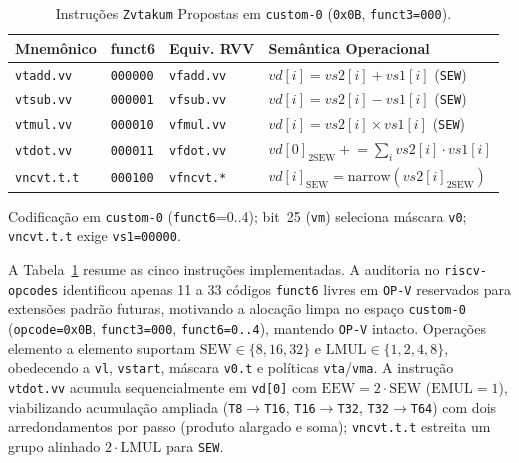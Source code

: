 \documentclass[conference]{IEEEtran}
\begin{document}
\begin{table}[t]
\caption{Instru\c{c}\~oes \texttt{Zvtakum} Propostas em \texttt{custom-0} (\texttt{0x0B}, \texttt{funct3=000}).}
\label{tab:zvtakum_isa}
\centering
\scriptsize
\setlength{\tabcolsep}{3.0pt}
\begin{tabular}{@{}llll@{}}
\toprule
Mnem\^onico & funct6 & Equiv. RVV & Sem\^antica Operacional \\
\midrule
\texttt{vtadd.vv} & \texttt{000000} & \texttt{vfadd.vv} & $vd[i] = vs2[i] + vs1[i]$ (\texttt{SEW}) \\
\texttt{vtsub.vv} & \texttt{000001} & \texttt{vfsub.vv} & $vd[i] = vs2[i] - vs1[i]$ (\texttt{SEW}) \\
\texttt{vtmul.vv} & \texttt{000010} & \texttt{vfmul.vv} & $vd[i] = vs2[i] \times vs1[i]$ (\texttt{SEW}) \\
\texttt{vtdot.vv} & \texttt{000011} & \texttt{vfdot.vv} & $vd[0]_{2\mathrm{SEW}} \mathrel{+}= \sum_i vs2[i]\cdot vs1[i]$ \\
\texttt{vncvt.t.t} & \texttt{000100} & \texttt{vfncvt.*} & $vd[i]_{\mathrm{SEW}} = \mathrm{narrow}(vs2[i]_{2\mathrm{SEW}})$ \\
\bottomrule
\end{tabular}
\vspace{2pt}
\raggedright\footnotesize{Codifica\c{c}\~ao em \texttt{custom-0} (\texttt{funct6}=0..4); bit~25 (\texttt{vm}) seleciona m\'ascara \texttt{v0}; \texttt{vncvt.t.t} exige \texttt{vs1=00000}.}
\end{table}

A Tabela~\ref{tab:zvtakum_isa} resume as cinco instru\c{c}\~oes implementadas. A auditoria no \texttt{riscv-opcodes} identificou apenas 11 a 33 c\'odigos \texttt{funct6} livres em \texttt{OP-V} reservados para extens\~oes padr\~ao futuras, motivando a aloca\c{c}\~ao limpa no espa\c{c}o \texttt{custom-0} (\texttt{opcode=0x0B}, \texttt{funct3=000}, \texttt{funct6=0..4}), mantendo \texttt{OP-V} intacto. Opera\c{c}\~oes elemento a elemento suportam $\mathrm{SEW}\in\{8,16,32\}$ e $\mathrm{LMUL}\in\{1,2,4,8\}$, obedecendo a \texttt{vl}, \texttt{vstart}, m\'ascara \texttt{v0.t} e pol\'iticas \texttt{vta}/\texttt{vma}. A instru\c{c}\~ao \texttt{vtdot.vv} acumula sequencialmente em \texttt{vd[0]} com $\mathrm{EEW}=2\cdot\mathrm{SEW}$ ($\mathrm{EMUL}=1$), viabilizando acumula\c{c}\~ao ampliada (\texttt{T8$\to$T16}, \texttt{T16$\to$T32}, \texttt{T32$\to$T64}) com dois arredondamentos por passo (produto alargado e soma); \texttt{vncvt.t.t} estreita um grupo alinhado $2\cdot\mathrm{LMUL}$ para \texttt{SEW}.
\end{document}
